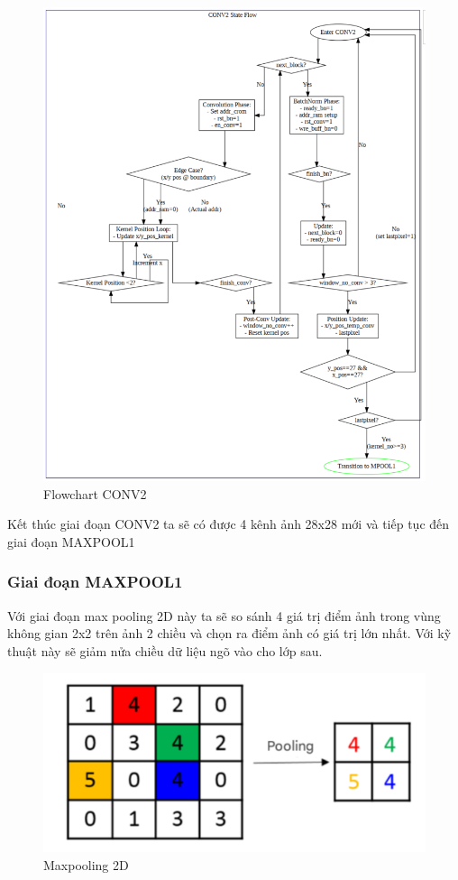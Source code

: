 \begin{figure}[H]
    \centering
    \includegraphics[width=0.75\linewidth]{Images/conv2flow.png}
    \caption{Flowchart CONV2}
    \label{fig:enter-label}
\end{figure}

Kết thúc giai đoạn CONV2 ta sẽ có được 4 kênh ảnh 28x28 mới và tiếp tục đến giai đoạn MAXPOOL1

\subsubsection{Giai đoạn MAXPOOL1}
Với giai đoạn max pooling 2D này ta sẽ so sánh 4 giá trị điểm ảnh trong vùng không gian 2x2 trên ảnh 2 chiều và chọn ra điểm ảnh có giá trị lớn nhất. Với kỹ thuật này sẽ giảm nửa chiều dữ liệu ngõ vào cho lớp sau.

\begin{figure}[H]
    \centering
    \includegraphics[width=0.75\linewidth]{Images/pooling.png}
    \caption{Maxpooling 2D}
    \label{fig:enter-label}
\end{figure}

